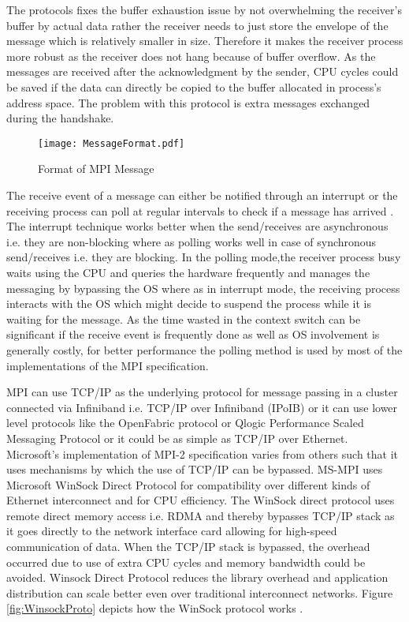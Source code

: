 The protocols fixes the buffer exhaustion issue by not overwhelming the receiver's buffer by actual data rather the receiver needs to just store the envelope of the message which is relatively smaller in size. Therefore it makes the receiver process more robust as the receiver does not hang because of buffer overflow. As the messages are received after the acknowledgment by the sender, CPU cycles could be saved if the data can directly be copied to the buffer allocated in process's address space. The problem with this protocol is extra messages exchanged during the handshake. 

\begin{figure}[ht!]
\centering
\texttt{[image: MessageFormat.pdf]}
\caption{Format of MPI Message}
\label{fig:MessageFormat}
\end{figure}

The receive event of a message can either be notified through an interrupt or the receiving process can poll at regular intervals to check if a message has arrived \cite{mpirel}. The interrupt technique works better when the send/receives are asynchronous i.e. they are non-blocking where as polling works well in case of synchronous send/receives i.e. they are blocking. In the polling mode,the receiver process busy waits using the CPU and queries the hardware frequently and manages the messaging by bypassing the OS where as in interrupt mode, the receiving process interacts with the OS which might decide to suspend the process while it is waiting for the message. As the time wasted in the context switch can be significant if the receive event is frequently done as well as OS involvement is generally costly, for better performance the polling method is used by most of the implementations of the MPI specification. \newline

MPI can use TCP/IP as the underlying protocol for message passing in a cluster connected via Infiniband i.e. TCP/IP over Infiniband (IPoIB) or it can use lower level protocols like the OpenFabric protocol or Qlogic Performance Scaled Messaging Protocol or it could be as simple as TCP/IP over Ethernet. Microsoft's implementation of MPI-2 specification varies from others such that it uses mechanisms by which the use of TCP/IP can be bypassed. MS-MPI uses Microsoft WinSock Direct Protocol for compatibility over different kinds of Ethernet interconnect and for CPU efficiency. The WinSock direct protocol \cite{SDP} uses remote direct memory access i.e. RDMA and thereby bypasses TCP/IP stack as it goes directly to the network interface card allowing for high-speed communication of data. When the TCP/IP stack is bypassed, the overhead occurred due to use of extra CPU cycles and memory bandwidth could be avoided. Winsock Direct Protocol reduces the library overhead and application distribution can scale better even over traditional interconnect networks. Figure \ref{fig:WinsockProto} depicts how the WinSock protocol works \cite{msmpiWinSoc}. \newline

